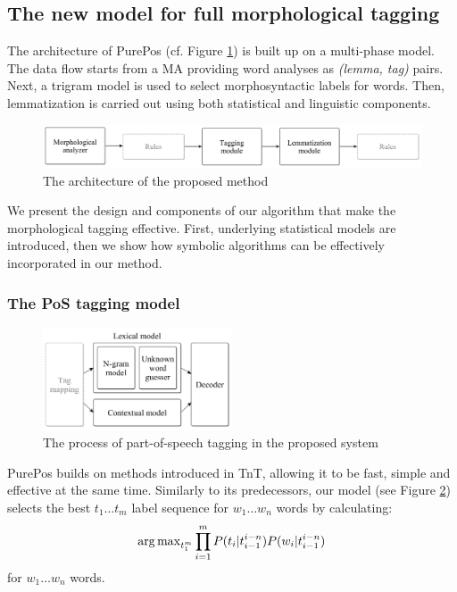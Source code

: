 \subsection{The new model for full morphological tagging}

The architecture of PurePos (cf. Figure \ref{fig:purepos-arch}) is built up on a multi-phase model. 
The data flow starts from a MA providing word analyses as \emph{(lemma, tag)} pairs. 
Next, a trigram model is used to select morphosyntactic labels for words. 
Then, lemmatization is carried out using both statistical and linguistic components. 

\begin{figure}[ht]
  \centering
  \includegraphics[width=1\textwidth]{MorphTagging/architecture.png} 
  \caption{The architecture of the proposed method}
  \label{fig:purepos-arch}
\end{figure}

We present the design and components of our algorithm that make the morphological tagging effective. First, underlying statistical models are introduced, then we show how symbolic algorithms can be effectively incorporated in our method. 

\subsubsection{The PoS tagging model}

\begin{figure}[ht]
  \centering
  \includegraphics[width=0.5\textwidth]{MorphTagging/pos_arch.png} 
  \caption{The process of part-of-speech tagging in the proposed system}
  \label{fig:pos_arch}
\end{figure}

PurePos builds on methods introduced in TnT, allowing it to be fast, simple and effective at the same time. 
Similarly to its predecessors, our model (see Figure \ref{fig:pos_arch}) selects the best $t_1 \dots t_m$ label sequence for $w_1 \dots w_n$ words by calculating:
\begin{equation}
\operatorname{arg\,max}_{t_1^m} \prod_{i=1}^m P(t_i | t_{i-1}^{i-n}) P(w_i|t_{i-1}^{i-n})
\end{equation}
for $w_1 \dots w_n$ words. 

